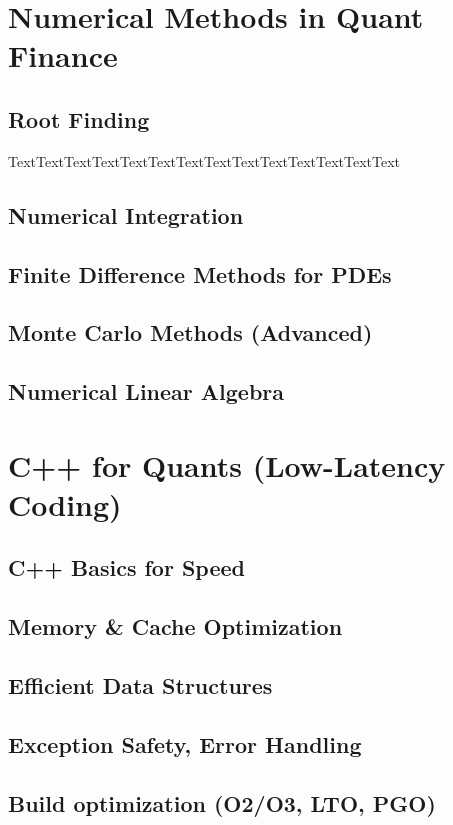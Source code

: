 \documentclass{report}
\begin{document}
\section{Numerical Methods in Quant Finance}

\subsection*{Root Finding}

TextTextTextTextTextTextTextTextTextTextTextTextTextText

\subsection*{Numerical Integration}
\subsection*{Finite Difference Methods for PDEs}
\subsection*{Monte Carlo Methods (Advanced)}
\subsection*{Numerical Linear Algebra}

\section{C++ for Quants (Low-Latency Coding)}

\subsection*{C++ Basics for Speed}
\subsection*{Memory \& Cache Optimization}
\subsection*{Efficient Data Structures}
\subsection*{Exception Safety, Error Handling}
\subsection*{Build optimization (O2/O3, LTO, PGO)}
\end{document}
